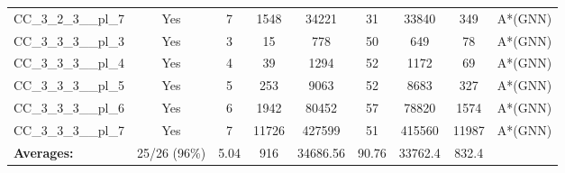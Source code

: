 \documentclass{article}
\begin{document}
\begin{tabular}{lcccccccc}
CC\_3\_2\_3\_\_pl\_7 & Yes & 7 & 1548 & 34221 & 31 & 33840 & 349 & A*(GNN) \\
CC\_3\_3\_3\_\_pl\_3 & Yes & 3 & 15 & 778 & 50 & 649 & 78 & A*(GNN) \\
CC\_3\_3\_3\_\_pl\_4 & Yes & 4 & 39 & 1294 & 52 & 1172 & 69 & A*(GNN) \\
CC\_3\_3\_3\_\_pl\_5 & Yes & 5 & 253 & 9063 & 52 & 8683 & 327 & A*(GNN) \\
CC\_3\_3\_3\_\_pl\_6 & Yes & 6 & 1942 & 80452 & 57 & 78820 & 1574 & A*(GNN) \\
CC\_3\_3\_3\_\_pl\_7 & Yes & 7 & 11726 & 427599 & 51 & 415560 & 11987 & A*(GNN) \\
\textbf{Averages:} & 25/26 (96\%) & 5.04 & 916 & 34686.56 & 90.76 & 33762.4 & 832.4 & \\
\bottomrule
\end{tabular}
\\[0.7cm]
\end{document}
